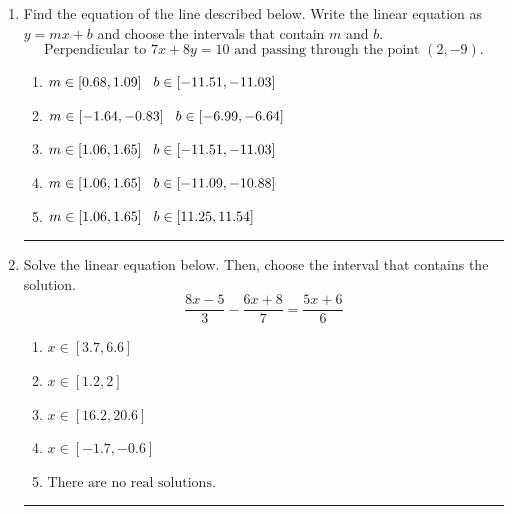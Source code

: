 \documentclass[14pt]{extbook}
\newcommand{\litem}[1]{\item#1\hspace*{-1cm}\rule{\textwidth}{0.4pt}}
\begin{document}
\begin{enumerate}
\litem{
Find the equation of the line described below. Write the linear equation as $ y=mx+b $ and choose the intervals that contain $m$ and $b$.\[ \text{Perpendicular to } 7 x + 8 y = 10 \text{ and passing through the point } (2, -9). \]\begin{enumerate}[label=\Alph*.]
\item \( m \in [0.68, 1.09] \hspace*{3mm} b \in [-11.51, -11.03] \)
\item \( m \in [-1.64, -0.83] \hspace*{3mm} b \in [-6.99, -6.64] \)
\item \( m \in [1.06, 1.65] \hspace*{3mm} b \in [-11.51, -11.03] \)
\item \( m \in [1.06, 1.65] \hspace*{3mm} b \in [-11.09, -10.88] \)
\item \( m \in [1.06, 1.65] \hspace*{3mm} b \in [11.25, 11.54] \)

\end{enumerate} }
\litem{
Solve the linear equation below. Then, choose the interval that contains the solution.\[ \frac{8x -5}{3} - \frac{6x + 8}{7} = \frac{5x + 6}{6} \]\begin{enumerate}[label=\Alph*.]
\item \( x \in [3.7, 6.6] \)
\item \( x \in [1.2, 2] \)
\item \( x \in [16.2, 20.6] \)
\item \( x \in [-1.7, -0.6] \)
\item \( \text{There are no real solutions.} \)


\end{enumerate}}
\end{enumerate}
\end{document}
